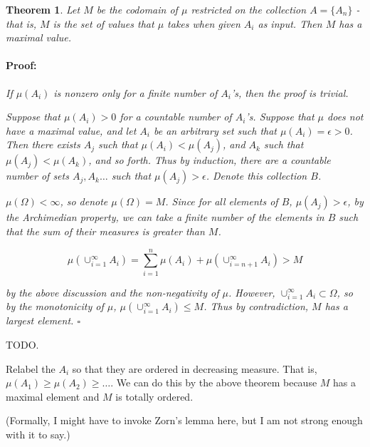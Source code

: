 \documentclass{article}
\newenvironment{proof}{\paragraph{Proof:}}{\hfill$\square$}
\newtheorem{theorem}{Theorem}
\begin{document}
\begin{theorem}
Let $M$ be the codomain of $\mu$ restricted on the collection $A = \{A_n\}$ - that is, $M$ is the set of values that $\mu$ takes when given $A_i$ as input. Then $M$ has a maximal value.
\begin{proof}
If $\mu(A_i)$ is nonzero only for a finite number of $A_i$'s, then the proof is trivial.

Suppose that $\mu(A_i) > 0$ for a countable number of $A_i$'s. Suppose that $\mu$ does not have a maximal value, and let $A_i$ be an arbitrary set such that $\mu(A_i) = \epsilon > 0$. Then there exists $A_j$ such that $\mu(A_i) < \mu(A_j)$, and $A_k$ such that $\mu(A_j) < \mu(A_k)$, and so forth. Thus by induction, there are a countable number of sets $A_j, A_k \dots$ such that $\mu(A_j) > \epsilon$. Denote this collection $B$.

$\mu(\Omega) < \infty$, so denote $\mu(\Omega) = M$. Since for all elements of $B$, $\mu(A_j) > \epsilon$, by the Archimedian property, we can take a finite number of the elements in $B$ such that the sum of their measures is greater than $M$.

\[
\mu(\cup_{i=1}^\infty A_i) = \sum_{i=1}^n \mu(A_i) + \mu(\cup_{i=n+1}^\infty A_i) > M
\]

by the above discussion and the non-negativity of $\mu$. However, $\cup_{i=1}^\infty A_i \subset \Omega$, so by the monotonicity of $\mu$, $\mu(\cup_{i=1}^\infty A_i) \leq M$. Thus by contradiction, $M$ has a largest element.
\end{proof}
\end{theorem}

TODO.

Relabel the $A_i$ so that they are ordered in decreasing measure. That is, $\mu(A_1) \geq \mu(A_2) \geq \dots$. We can do this by the above theorem because $M$ has a maximal element and $M$ is totally ordered.

(Formally, I might have to invoke Zorn's lemma here, but I am not strong enough with it to say.)
\end{document}

